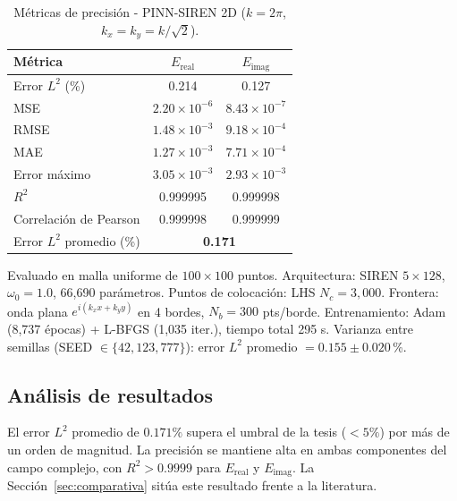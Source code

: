 \begin{table}[htbp]
\centering
\begin{threeparttable}
\caption{Métricas de precisión - PINN-SIREN 2D ($k = 2\pi$, $k_x = k_y = k/\sqrt{2}$).}
\label{tab:resultados2d}
\begin{tabular}{lcc}
\toprule
Métrica & $E_\text{real}$ & $E_\text{imag}$ \\
\midrule
Error $L^2$ (\%)         & 0.214              & 0.127              \\
MSE                      & $2.20 \times 10^{-6}$ & $8.43 \times 10^{-7}$ \\
RMSE                     & $1.48 \times 10^{-3}$ & $9.18 \times 10^{-4}$ \\
MAE                      & $1.27 \times 10^{-3}$ & $7.71 \times 10^{-4}$ \\
Error máximo             & $3.05 \times 10^{-3}$ & $2.93 \times 10^{-3}$ \\
$R^2$                    & 0.999995           & 0.999998           \\
Correlación de Pearson   & 0.999998           & 0.999999           \\
\midrule
Error $L^2$ promedio (\%)& \multicolumn{2}{c}{\textbf{0.171}} \\
\bottomrule
\end{tabular}
\begin{tablenotes}\small
    \item Evaluado en malla uniforme de $100 \times 100$ puntos.
    Arquitectura: SIREN $5 \times 128$, $\omega_0 = 1.0$, 66{,}690 parámetros.
    Puntos de colocación: LHS $N_c = 3{,}000$.
    Frontera: onda plana $e^{i(k_x x + k_y y)}$ en 4 bordes, $N_b = 300$ pts/borde.
    Entrenamiento: Adam (8{,}737 épocas) + L-BFGS (1{,}035 iter.), tiempo total 295 s.
    Varianza entre semillas (SEED $\in \{42, 123, 777\}$):
    error $L^2$ promedio $= 0.155 \pm 0.020$\,\%.
\end{tablenotes}
\end{threeparttable}
\end{table}

\subsection{Análisis de resultados}

El error $L^2$ promedio de $0.171\%$ supera el umbral de la tesis ($< 5\%$) por
más de un orden de magnitud. La precisión se mantiene alta en ambas componentes
del campo complejo, con $R^2 > 0.9999$ para $E_\text{real}$ y $E_\text{imag}$.
La Sección~\ref{sec:comparativa} sitúa este resultado frente a la literatura.

